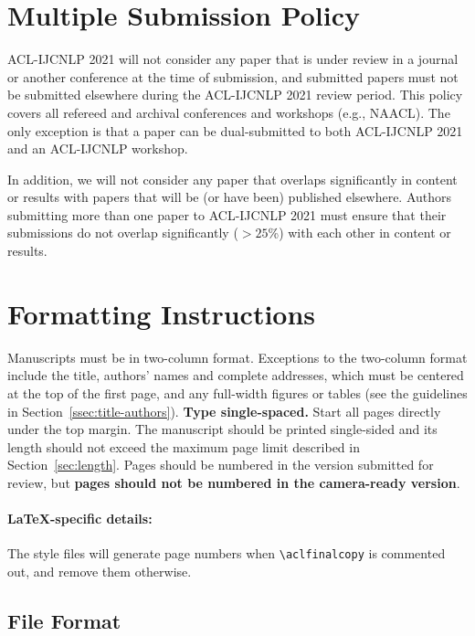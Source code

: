 \documentclass[11pt,a4paper]{article}
\begin{document}
	
	\section{Multiple Submission Policy}
	
	ACL-IJCNLP 2021 will not consider any paper that is under review in a journal or another conference at the time of submission, and submitted papers must not be submitted elsewhere during the ACL-IJCNLP 2021 review period. This policy covers all refereed and archival conferences and workshops (e.g., NAACL). The only exception is that a paper can be dual-submitted to both ACL-IJCNLP 2021 and an ACL-IJCNLP workshop. 
	
	In addition, we will not consider any paper that overlaps significantly in content or results with papers that will be (or have been) published elsewhere. 
	Authors submitting more than one paper to ACL-IJCNLP 2021 must ensure that their submissions do not overlap significantly ($>25$\%) with each other in content or results.
	
	\section{Formatting Instructions}
	
	Manuscripts must be in two-column format.
	Exceptions to the two-column format include the title, authors' names and complete addresses, which must be centered at the top of the first page, and any full-width figures or tables (see the guidelines in Section~\ref{ssec:title-authors}).
	\textbf{Type single-spaced.}
	Start all pages directly under the top margin.
	The manuscript should be printed single-sided and its length should not exceed the maximum page limit described in Section~\ref{sec:length}.
	Pages should be numbered in the version submitted for review, but \textbf{pages should not be numbered in the camera-ready version}.
	
	\paragraph{\LaTeX-specific details:}
	The style files will generate page numbers when {\small\verb|\aclfinalcopy|} is commented out, and remove them otherwise.
	
	
	\subsection{File Format}
	\label{sect:pdf}
	
\end{document}
